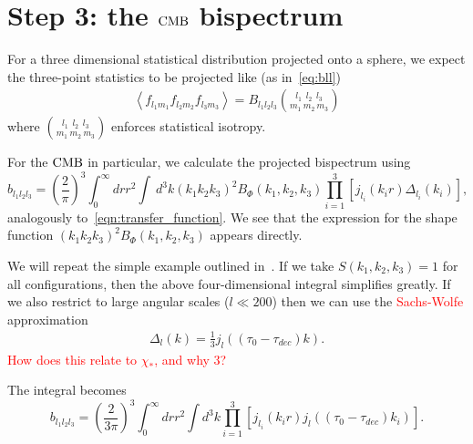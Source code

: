 \section{Step 3: the $\text{CMB}$ bispectrum}
    For a three dimensional statistical distribution projected onto
    a sphere, we expect the three-point statistics to be projected
    like (as in~\eqref{eq:bll})
    \begin{align}
        \left<f_{l_1m_1}f_{l_2m_2}f_{l_3m_3}\right> = B_{l_1l_2l_3}{{l_1~~l_2~~l_3} \choose {m_1~m_2~m_3}}
    \end{align}
    where ${{l_1~~l_2~~l_3} \choose {m_1~m_2~m_3}}$ enforces statistical isotropy.


    For the $\text{CMB}$ in particular, we calculate the projected bispectrum using~\cite{FergShell_2}
    \begin{equation}
    \label{eq:reduced_cmb}
    b_{l_1l_2l_3} = \left(\frac{2}{\pi}\right)^3\int_{0}^{\infty}drr^2
        \int~d^3k (k_1k_2k_3)^2 B_{\Phi}(k_1,k_2,k_3)\prod_{i=1}^{3}\left[j_{l_i}(k_ir)\Delta_{l_i}(k_i)\right],
    \end{equation}
    analogously to~\eqref{eqn:transfer_function}.
    We see that the expression for the shape function $(k_1k_2k_3)^2 B_{\Phi}(k_1,k_2,k_3)$ appears directly.


    We will repeat the simple example outlined in~\cite{FergShell_2}. If we
    take $S(k_1,k_2,k_3)=1$ for all configurations, then the above four-dimensional integral
    simplifies greatly. If we also restrict to large angular scales ($l\ll200$)
    then we can use the \textcolor{red}{Sachs-Wolfe} approximation
    \begin{align}
        \Delta_l(k) = \frac{1}{3}j_l((\tau_0-\tau_{dec})k).
    \end{align}
    \textcolor{red}{How does this relate to $\chi_*$, and why $3$?}

    The integral becomes
    \begin{equation}
    \label{eq:reduced_cmb_constant}
    b_{l_1l_2l_3} = \left(\frac{2}{3\pi}\right)^3\int_{0}^{\infty}drr^2
        \int d^3k \prod_{i=1}^{3}\left[j_{l_i}(k_ir)j_l((\tau_0-\tau_{dec})k_i)\right].
    \end{equation}


